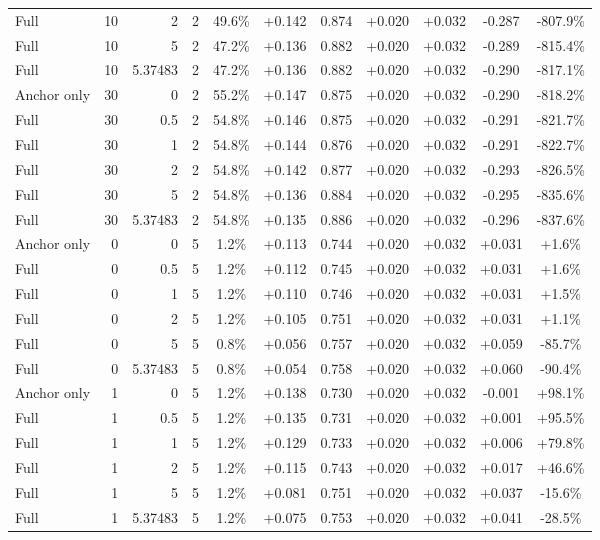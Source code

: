 \begin{table}[htbp]
\begin{tabular}{lrrrccccccc}
Full & 10 & 2 & 2 & 49.6\% & +0.142 & 0.874 & +0.020 & +0.032 & -0.287 & -807.9\% \\
Full & 10 & 5 & 2 & 47.2\% & +0.136 & 0.882 & +0.020 & +0.032 & -0.289 & -815.4\% \\
Full & 10 & 5.37483 & 2 & 47.2\% & +0.136 & 0.882 & +0.020 & +0.032 & -0.290 & -817.1\% \\
Anchor only & 30 & 0 & 2 & 55.2\% & +0.147 & 0.875 & +0.020 & +0.032 & -0.290 & -818.2\% \\
Full & 30 & 0.5 & 2 & 54.8\% & +0.146 & 0.875 & +0.020 & +0.032 & -0.291 & -821.7\% \\
Full & 30 & 1 & 2 & 54.8\% & +0.144 & 0.876 & +0.020 & +0.032 & -0.291 & -822.7\% \\
Full & 30 & 2 & 2 & 54.8\% & +0.142 & 0.877 & +0.020 & +0.032 & -0.293 & -826.5\% \\
Full & 30 & 5 & 2 & 54.8\% & +0.136 & 0.884 & +0.020 & +0.032 & -0.295 & -835.6\% \\
Full & 30 & 5.37483 & 2 & 54.8\% & +0.135 & 0.886 & +0.020 & +0.032 & -0.296 & -837.6\% \\
Anchor only & 0 & 0 & 5 & 1.2\% & +0.113 & 0.744 & +0.020 & +0.032 & +0.031 & +1.6\% \\
Full & 0 & 0.5 & 5 & 1.2\% & +0.112 & 0.745 & +0.020 & +0.032 & +0.031 & +1.6\% \\
Full & 0 & 1 & 5 & 1.2\% & +0.110 & 0.746 & +0.020 & +0.032 & +0.031 & +1.5\% \\
Full & 0 & 2 & 5 & 1.2\% & +0.105 & 0.751 & +0.020 & +0.032 & +0.031 & +1.1\% \\
Full & 0 & 5 & 5 & 0.8\% & +0.056 & 0.757 & +0.020 & +0.032 & +0.059 & -85.7\% \\
Full & 0 & 5.37483 & 5 & 0.8\% & +0.054 & 0.758 & +0.020 & +0.032 & +0.060 & -90.4\% \\
Anchor only & 1 & 0 & 5 & 1.2\% & +0.138 & 0.730 & +0.020 & +0.032 & -0.001 & +98.1\% \\
Full & 1 & 0.5 & 5 & 1.2\% & +0.135 & 0.731 & +0.020 & +0.032 & +0.001 & +95.5\% \\
Full & 1 & 1 & 5 & 1.2\% & +0.129 & 0.733 & +0.020 & +0.032 & +0.006 & +79.8\% \\
Full & 1 & 2 & 5 & 1.2\% & +0.115 & 0.743 & +0.020 & +0.032 & +0.017 & +46.6\% \\
Full & 1 & 5 & 5 & 1.2\% & +0.081 & 0.751 & +0.020 & +0.032 & +0.037 & -15.6\% \\
Full & 1 & 5.37483 & 5 & 1.2\% & +0.075 & 0.753 & +0.020 & +0.032 & +0.041 & -28.5\% \\

\end{tabular}
\end{table}
